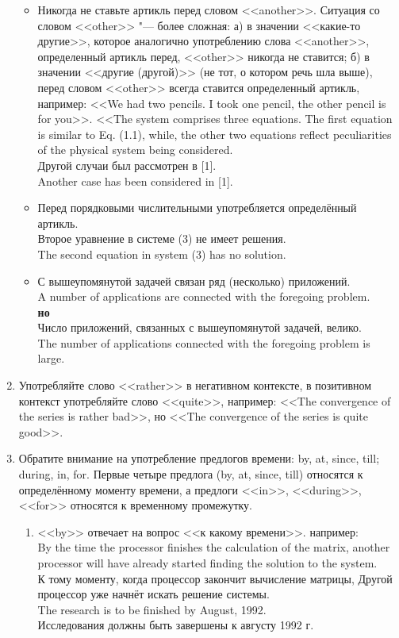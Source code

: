 \documentclass[a5paper, 10pt, twoside, numbers=enddot]{scrartcl}
\begin{document}
\begin{enumerate}
\begin{itemize}
   \item Никогда не ставьте артикль перед словом <<another>>. Ситуация со словом <<other>> "--- более сложная: а) в значении <<какие-то другие>>, которое аналогично употреблению слова <<another>>, определенный артикль перед, <<other>> никогда не ставится; б) в значении <<другие (другой)>> (не тот, о котором речь шла выше), перед словом <<other>> всегда ставится определенный артикль, например: <<We had two pencils. I took one pencil, the other pencil is for you>>. <<The system comprises three equations. The first equation is similar to Eq. (1.1), while, the other two equations reflect peculiarities of the physical system being considered. \\ [4pt] \textsf{
     Другой случаи был рассмотрен в [1]. \\
     Another case has been considered in [1].}
  
   \item Перед порядковыми числительными употребляется определённый артикль. \\ [4pt] \textsf{
     Второе уравнение в системе (3) не имеет решения. \\
     The second equation in system (3) has no solution.}

   \item \textsf{С вышеупомянутой задачей связан ряд (несколько) приложений. \\ 
     A number of applications are connected with the foregoing problem. \\ [4pt]
     \textbf{но} \\ [4pt]
     Число приложений, связанных с вышеупомянутой задачей, велико. \\
     The number of applications connected with the foregoing problem is large.}
  \end{itemize}   

  \item Употребляйте слово <<rather>> в негативном контексте, в позитивном контекст употребляйте слово <<quite>>, например: <<The convergence of the series is rather bad>>, но <<The convergence of the series is quite good>>.

  \item Обратите внимание на употребление предлогов времени: by, at, since, till; during, in, for.
  Первые четыре предлога (by, at, since, till) относятся к определённому моменту времени, а предлоги <<in>>, <<during>>, <<for>> относятся к временному промежутку.
  \begin{enumerate}
    \item <<by>> отвечает на вопрос <<к какому времени>>. например: \\ [4pt]
    \textsf{By the time the processor finishes the calculation of the matrix, another processor will have already started finding the solution to the system.\\
    К тому моменту, когда процессор закончит вычисление матрицы, Другой процессор уже начнёт искать решение системы.\\ [4pt]
    The research is to be finished by August, 1992. \\
    Исследования должны быть завершены к августу 1992 г.}
    

\end{enumerate}
\end{enumerate}
\end{document}
